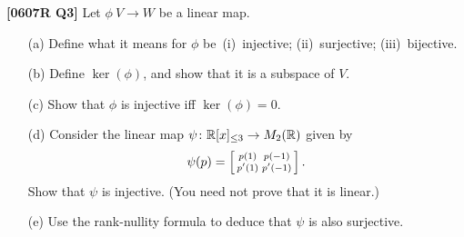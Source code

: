\documentclass[a4paper]{article}
\begin{document}
\begin{problem}\textbf{[0607R Q3]}
 Let $\phi\:V\to W$ be a linear map.
 \begin{itemize}
  \item[(a)]
   Define what it means for $\phi$
   be~(i)~injective; (ii)~surjective; (iii)~bijective. 
  \item[(b)] 
   Define $\ker(\phi)$, and show that it is a subspace of
   $V$. 
  \item[(c)] Show that $\phi$ is injective iff
   $\ker(\phi)=0$. 
  \item[(d)] Consider the linear map
   $\psi\colon{\mathbb{R}}[x]_{\leq 3}\to M_2({\mathbb{R}})$ given by 
   \[ \psi(p) = \left[\begin{smallmatrix} p(1) & p(-1) \\ p'(1) & p'(-1) \end{smallmatrix}\right]. \]
   Show that $\psi$ is injective. (You need not prove that
   it is linear.) 
  \item[(e)] Use the rank-nullity formula to deduce that
   $\psi$ is also surjective. 
 \end{itemize}
\end{problem}
\end{document}
